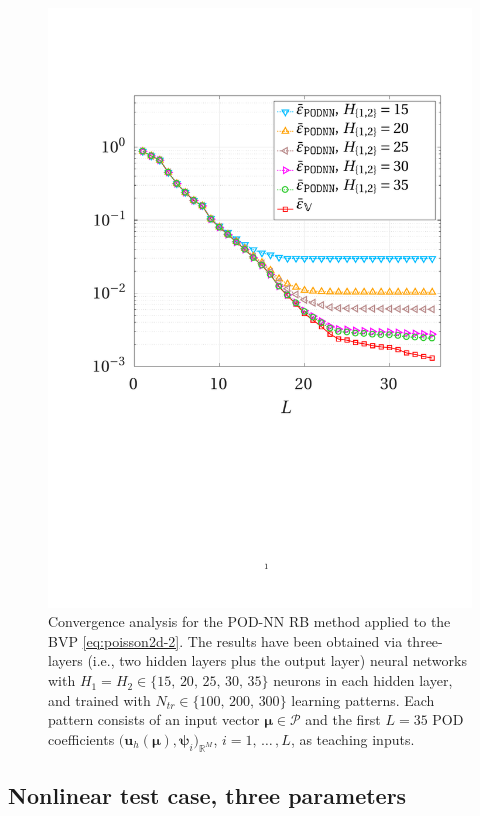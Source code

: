 \documentclass[12pt, a4paper, twoside, openright]{report}
\numberwithin{equation}{chapter}
\theoremstyle{theorem}
\theoremstyle{definition}
\theoremstyle{remark}
\theoremstyle{proposition}
\numberwithin{figure}{chapter}
\newcommand{\bg}[1]{\boldsymbol{#1}}
\begin{document}
\begin{figure}[H]
			\includegraphics[scale = 0.42, trim = {1.5cm 8.6cm 1.5cm 3.5cm}, clip]{poisson2d_2_nn_convergence}
			
			\caption{Convergence analysis for the POD-NN RB method applied to the BVP \eqref{eq:poisson2d-2}. The results have been obtained via three-layers (i.e., two hidden layers plus the output layer) neural networks with $H_1 = H_2 \in \big\lbrace 15, \, 20, \, 25, \, 30, \, 35 \big\rbrace$ neurons in each hidden layer, and trained with $N_{tr} \in \big\lbrace 100, \, 200, \, 300 \big\rbrace$ learning patterns. Each pattern consists of an input vector $\bg{\mu} \in \mathcal{P}$ and the first $L = 35$ POD coefficients $\big( \mathbf{u}_h(\bg{\mu}), \bg{\psi}_i \big)_{\mathbb{R}^M}$, $i = 1, \, \ldots \, , L$, as teaching inputs.}
			\label{fig:poisson2d-2-fig3}
		\end{figure}
				
	\subsection{Nonlinear test case, three parameters}
	\label{section:poisson2d-3}
	
\end{document}
